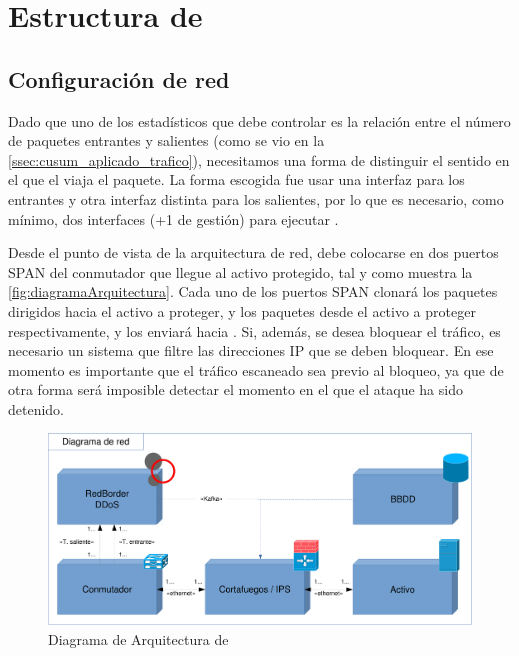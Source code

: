 \section{Estructura de \redborderddos}\label{sec:estructura}
\subsection{Configuración de red}\label{ssec:estructura_red}
Dado que uno de los estadísticos que \redborderddos{} debe controlar es la
relación entre el número de paquetes entrantes y salientes (como se vio en
la \ref{ssec:cusum_aplicado_trafico}), necesitamos una forma de distinguir el
sentido en el que el viaja el paquete. La forma escogida fue usar una interfaz
para los entrantes y otra interfaz distinta para los salientes, por lo que es
necesario, como mínimo, dos interfaces (+1 de gestión) para ejecutar
\redborderddos.

Desde el punto de vista de la arquitectura de red, \redborderddos{} debe colocarse en dos puertos SPAN del conmutador que llegue al activo protegido, tal y como muestra la \autoref{fig:diagramaArquitectura}. Cada uno de los
puertos SPAN clonará los paquetes dirigidos hacia el activo a proteger, y los paquetes desde el activo a proteger
respectivamente, y los enviará hacia \redborderddos.
Si, además, se desea bloquear el tráfico, es necesario
un sistema que filtre las direcciones IP que se deben bloquear.
En ese momento es importante que el tráfico escaneado sea
previo al bloqueo, ya que de otra forma será imposible detectar el momento en el que el ataque ha sido detenido.

\begin{figure}[htbp]
\centering
\includegraphics[width=\columnwidth]{CapituloEstructura/Figuras/DiagramaArquitectura-crop}
\caption{Diagrama de Arquitectura de \redborderddos}
\label{fig:diagramaArquitectura}
\end{figure}
%

